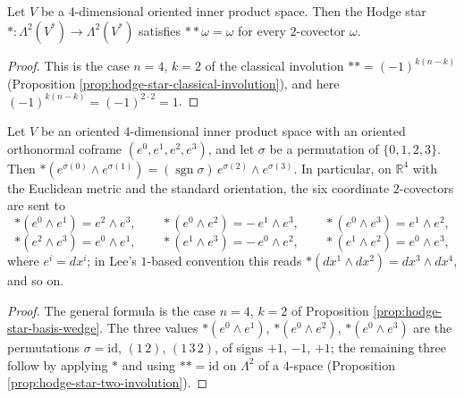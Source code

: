 \begin{proposition}
\label{prop:hodge-star-two-involution}
\leanok
{}
Let $V$ be a $4$-dimensional oriented inner product space. Then the Hodge star ${*} \colon \Lambda^2(V^*) \to \Lambda^2(V^*)$ satisfies ${*}{*}\omega = \omega$ for every $2$-covector $\omega$.
\end{proposition}
\begin{proof}
\leanok
This is the case $n = 4$, $k = 2$ of the classical involution ${*}{*} = (-1)^{k(n-k)}$ (Proposition \ref{prop:hodge-star-classical-involution}), and here $(-1)^{k(n-k)} = (-1)^{2 \cdot 2} = 1$.
\end{proof}

\begin{proposition}
\label{prop:hodge-star-euclidean-pair}
\leanok
{}
Let $V$ be an oriented $4$-dimensional inner product space with an oriented orthonormal coframe $(e^0,e^1,e^2,e^3)$, and let $\sigma$ be a permutation of $\{0,1,2,3\}$. Then ${*}(e^{\sigma(0)} \wedge e^{\sigma(1)}) = (\operatorname{sgn}\sigma)\, e^{\sigma(2)} \wedge e^{\sigma(3)}$. In particular, on $\mathbb{R}^4$ with the Euclidean metric and the standard orientation, the six coordinate $2$-covectors are sent to
\[
{*}(e^0 \wedge e^1) = e^2 \wedge e^3,\qquad
{*}(e^0 \wedge e^2) = -\,e^1 \wedge e^3,\qquad
{*}(e^0 \wedge e^3) = e^1 \wedge e^2,
\]
\[
{*}(e^2 \wedge e^3) = e^0 \wedge e^1,\qquad
{*}(e^1 \wedge e^3) = -\,e^0 \wedge e^2,\qquad
{*}(e^1 \wedge e^2) = e^0 \wedge e^3,
\]
where $e^i = dx^i$; in Lee's $1$-based convention this reads ${*}(dx^1 \wedge dx^2) = dx^3 \wedge dx^4$, and so on.
\end{proposition}
\begin{proof}
\leanok
{}
The general formula is the case $n = 4$, $k = 2$ of Proposition \ref{prop:hodge-star-basis-wedge}. The three values ${*}(e^0\wedge e^1)$, ${*}(e^0\wedge e^2)$, ${*}(e^0\wedge e^3)$ are the permutations $\sigma = \mathrm{id}$, $(1\,2)$, $(1\,3\,2)$, of signs $+1$, $-1$, $+1$; the remaining three follow by applying ${*}$ and using ${*}{*} = \mathrm{id}$ on $\Lambda^2$ of a $4$-space (Proposition \ref{prop:hodge-star-two-involution}).
\end{proof}

